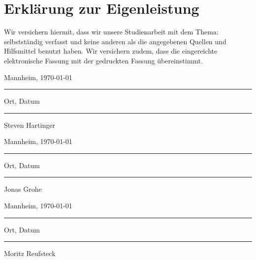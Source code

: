 \section*{Erklärung zur Eigenleistung}
Wir versichern hiermit, dass wir unsere Studienarbeit mit dem Thema: \textit{\thetitle} selbstständig verfasst und keine anderen als die angegebenen Quellen und Hilfsmittel benutzt haben. Wir versichern zudem, dass die eingereichte elektronische Fassung mit der gedruckten Fassung übereinstimmt.

\begin{minipage}{\textwidth}
    \begin{center}
        \vspace{2.5cm}
        \parbox{6cm}{\centering Mannheim, \gerFormat\today \hrule
        \strut \centering\footnotesize Ort, Datum} \hfill\parbox{4cm}{\hrule
        \strut \centering\footnotesize Steven Hartinger}        
    \end{center}
\end{minipage}

\begin{minipage}{\textwidth}
    \begin{center}
        \vspace{1cm}
        \parbox{6cm}{\centering Mannheim, \gerFormat\today \hrule
        \strut \centering\footnotesize Ort, Datum} \hfill\parbox{4cm}{\hrule
        \strut \centering\footnotesize Jonas Grohe}        
    \end{center}
\end{minipage}

\begin{minipage}{\textwidth}
    \begin{center}
        \vspace{1cm}
        \parbox{6cm}{\centering Mannheim, \gerFormat\today \hrule
        \strut \centering\footnotesize Ort, Datum} \hfill\parbox{4cm}{\hrule
        \strut \centering\footnotesize Moritz Reufsteck}        
    \end{center}
\end{minipage}
